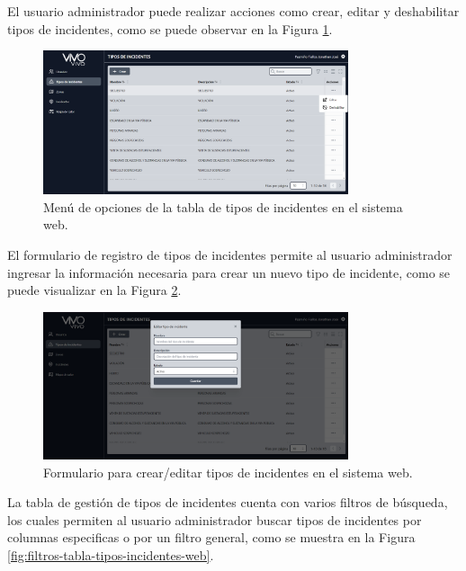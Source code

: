 El usuario administrador puede realizar acciones como crear, editar y deshabilitar tipos de incidentes, como se puede observar en la Figura
\ref{fig:menu-tabla-tipos-incidentes-web}.

\begin{figure}[H]
    \centering
    \includegraphics[width=0.8\textwidth]{chapters/III-resultados-y-discusion/resources/images/menu-tabla-tipos-incidentes-web.png}
    \caption{Menú de opciones de la tabla de tipos de incidentes en el sistema web.}
    \label{fig:menu-tabla-tipos-incidentes-web}
\end{figure}

El formulario de registro de tipos de incidentes permite al usuario administrador ingresar
la información necesaria para crear un nuevo tipo de incidente, como se puede visualizar en la Figura \ref{fig:formulario-tipo-incidente-web}.

\begin{figure}[H]
    \centering
    \includegraphics[width=0.8\textwidth]{chapters/III-resultados-y-discusion/resources/images/formulario-tipo-incidente-web.png}
    \caption{Formulario para crear/editar tipos de incidentes en el sistema web.}
    \label{fig:formulario-tipo-incidente-web}
\end{figure}

La tabla de gestión de tipos de incidentes cuenta con varios filtros de búsqueda, los cuales permiten al usuario administrador buscar
tipos de incidentes por columnas especificas o por un filtro general, como se muestra en la Figura \ref{fig:filtros-tabla-tipos-incidentes-web}.

